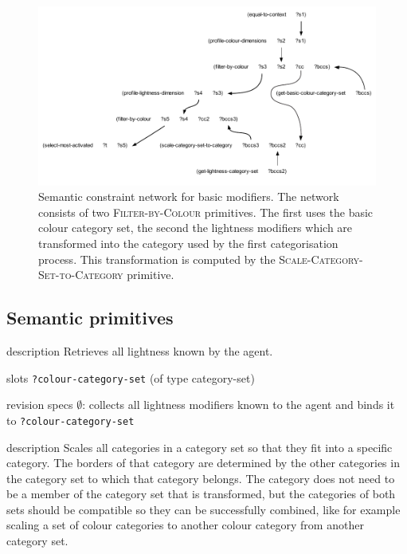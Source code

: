 \begin{figure}[htpb]
  \centering
  \includegraphics[width=\textwidth]{./achromatic/figures/semantic-program.pdf}
  \caption[Semantic constraint network for basic
  modifiers]{Semantic constraint network for basic modifiers. The
    network consists of two \textsc{Filter-by-Colour} primitives. The
    first uses the basic colour category set, the second the
    lightness modifiers which are transformed into the category used
    by the first categorisation process. This transformation is
    computed by the \textsc{Scale-Category-Set-to-Category}
    primitive.}
  \label{f:ams-semantic-structure}
\end{figure}

\subsection{Semantic primitives}


\begin{explanation}{description}
  Retrieves all lightness known by the agent.
\end{explanation}

\begin{explanation}{slots}
  \verb+?colour-category-set+ (of type category-set)
\end{explanation}

\begin{explanation}{revision specs}
  $\emptyset$: collects all lightness modifiers known to the agent
  and binds it to \verb+?colour-category-set+
\end{explanation}


\begin{explanation}{description}
  Scales all categories in a category set so that they fit into a
  specific category. The borders of that category are determined by
  the other categories in the category set to which that category
  belongs. The category does not need to be a member of the category
  set that is transformed, but the categories of both sets should be
  compatible so they can be successfully combined, like for example
  scaling a set of colour categories to another colour category from
  another category set.
\end{explanation}

